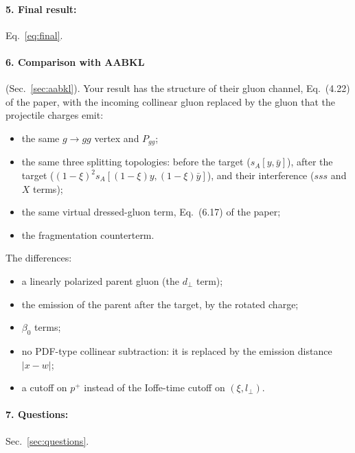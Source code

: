 \documentclass[10pt]{article}
\numberwithin{equation}{section}
\begin{document}
\paragraph{5. Final result:} Eq.~\eqref{eq:final}.

\paragraph{6. Comparison with AABKL} (Sec.~\ref{sec:aabkl}). Your result has the structure of their gluon channel, Eq.~(4.22) of the paper, with the incoming collinear gluon replaced by the gluon that the projectile charges emit:
\begin{itemize}
\item the same $g\to gg$ vertex and $P_{gg}$;
\item the same three splitting topologies: before the target ($s_A[y,\bar y]$), after the target ($(1-\xi)^2s_A[(1-\xi)y,(1-\xi)\bar y]$), and their interference ($ss s$ and $X$ terms);
\item the same virtual dressed-gluon term, Eq.~(6.17) of the paper;
\item the fragmentation counterterm.
\end{itemize}
The differences:
\begin{itemize}
\item a linearly polarized parent gluon (the $d_\perp$ term);
\item the emission of the parent after the target, by the rotated charge;
\item $\beta_0$ terms;
\item no PDF-type collinear subtraction: it is replaced by the emission distance $|x-w|$;
\item a cutoff on $p^+$ instead of the Ioffe-time cutoff on $(\xi,l_\perp)$.
\end{itemize}

\paragraph{7. Questions:} Sec.~\ref{sec:questions}.

\end{document}
